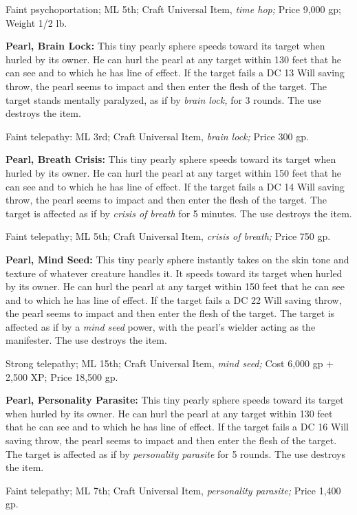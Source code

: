\documentclass{article}
\begin{document}
Faint psychoportation; ML 5th; Craft Universal Item, \textit{time hop; }Price 9,000 
gp; Weight 1/2 lb.

\textbf{Pearl, Brain Lock:} This tiny pearly sphere speeds toward its target when 
hurled by its owner. He can hurl the pearl at any target within 130 feet that he 
can see and to which he has line of effect. If the target fails a DC 13 Will saving 
throw, the pearl seems to impact and then enter the flesh of the target. The target 
stands mentally paralyzed, as if by \textit{brain lock, }for 3 rounds. The use 
destroys the item. 

Faint telepathy: ML 3rd; Craft Universal Item, \textit{brain lock; }Price 300 gp.

\textbf{Pearl, Breath Crisis:} This tiny pearly sphere speeds toward its target 
when hurled by its owner. He can hurl the pearl at any target within 150 feet that 
he can see and to which he has line of effect. If the target fails a DC 14 Will 
saving throw, the pearl seems to impact and then enter the flesh of the target. 
The target is affected as if by \textit{crisis of breath }for 5 minutes. The use 
destroys the item. 

Faint telepathy; ML 5th; Craft Universal Item, \textit{crisis of breath; }Price 
750 gp.

\textbf{Pearl, Mind Seed: }This tiny pearly sphere instantly takes on the skin 
tone and texture of whatever creature handles it. It speeds toward its target when 
hurled by its owner. He can hurl the pearl at any target within 150 feet that he 
can see and to which he has line of effect. If the target fails a DC 22 Will saving 
throw, the pearl seems to impact and then enter the flesh of the target. The target 
is affected as if by a \textit{mind seed }power, with the pearl's wielder acting 
as the manifester. The use destroys the item.

Strong telepathy; ML 15th; Craft Universal Item, \textit{mind seed; }Cost 6,000 
gp + 2,500 XP; Price 18,500 gp.

\textbf{Pearl, Personality Parasite:} This tiny pearly sphere speeds toward its 
target when hurled by its owner. He can hurl the pearl at any target within 130 
feet that he can see and to which he has line of effect. If the target fails a 
DC 16 Will saving throw, the pearl seems to impact and then enter the flesh of 
the target. The target is affected as if by \textit{personality parasite }for 5 
rounds. The use destroys the item. 

Faint telepathy; ML 7th; Craft Universal Item, \textit{personality parasite; }Price 
1,400 gp.
\end{document}
